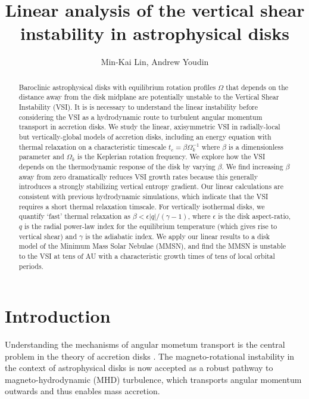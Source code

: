 \documentclass[iop]{emulateapj}
\begin{document}
\title{Linear analysis of the vertical shear instability in astrophysical disks}

\author{Min-Kai Lin, Andrew Youdin}

\begin{abstract}
  Baroclinic astrophysical disks with equilibrium rotation profiles
  $\Omega$ that depends on the distance away from the disk midplane are
  potentially unstable to the Vertical Shear Instability (VSI). It is
  is necessary to understand the linear instability before
  considering the VSI as a hydrodynamic route to turbulent angular
  momentum transport in accretion disks. We study the linear,
  axisymmetric VSI in radially-local but vertically-global models
  of accretion disks, including an energy equation with thermal
  relaxation on a characteristic timescale $t_c=\beta\Omega_k^{-1}$
  where $\beta$ is a dimensionless parameter and $\Omega_k$ is the
  Keplerian rotation frequency. We explore how the VSI depends on the
  thermodynamic response  of the disk by varying $\beta$. We find
  increasing $\beta$ away from zero dramatically reduces VSI growth
  rates because this generally introduces a strongly stabilizing
  vertical entropy gradient. Our linear calculations are consistent
  with previous hydrodynamic simulations, which indicate that the VSI
  requires a short thermal relaxation timscale. For vertically
  isothermal disks, we quantify `fast'
  thermal relaxation as $\beta < \epsilon|q|/(\gamma-1)$, where
  $\epsilon$ is the disk aspect-ratio, $q$ is the radial power-law
  index for the equilibrium temperature (which gives rise to vertical
  shear) and $\gamma$ is the adiabatic index. We apply our linear
  results to a disk model of the Minimum Mass Solar Nebulae (MMSN), and
  find the MMSN is unstable to the VSI at tens of AU with a
  characteristic growth times of tens of local orbital periods. 
\end{abstract}

\section{Introduction}
Understanding the mechanisms of angular mometum transport is the
central problem in the theory of accretion disks
\citep{lydenbell74}. The
magneto-rotational instability in the context of astrophysical disks 
\citep{balbus91} is now accepted as a robust pathway to
magneto-hydrodynamic (MHD) turbulence, which transports angular momentum
outwards and thus enables mass accretion. 
\end{document}
